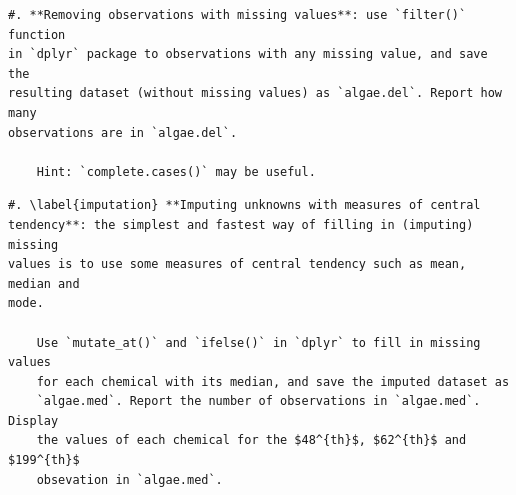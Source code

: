 \documentclass[]{article}
\newenvironment{Shaded}{\begin{snugshade}}{\end{snugshade}}
\newcommand{\KeywordTok}[1]{\textcolor[rgb]{0.13,0.29,0.53}{\textbf{#1}}}
\newcommand{\StringTok}[1]{\textcolor[rgb]{0.31,0.60,0.02}{#1}}
\newcommand{\OperatorTok}[1]{\textcolor[rgb]{0.81,0.36,0.00}{\textbf{#1}}}
\newcommand{\NormalTok}[1]{#1}
\begin{document}
\begin{verbatim}
#. **Removing observations with missing values**: use `filter()` function
in `dplyr` package to observations with any missing value, and save the
resulting dataset (without missing values) as `algae.del`. Report how many
observations are in `algae.del`.

    Hint: `complete.cases()` may be useful.
\end{verbatim}

\begin{Shaded}
\end{Shaded}

\begin{verbatim}
#. \label{imputation} **Imputing unknowns with measures of central
tendency**: the simplest and fastest way of filling in (imputing) missing
values is to use some measures of central tendency such as mean, median and
mode.
    
    Use `mutate_at()` and `ifelse()` in `dplyr` to fill in missing values
    for each chemical with its median, and save the imputed dataset as
    `algae.med`. Report the number of observations in `algae.med`.  Display
    the values of each chemical for the $48^{th}$, $62^{th}$ and $199^{th}$
    obsevation in `algae.med`. 
\end{verbatim}
\end{document}
